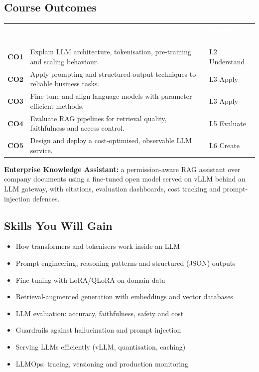 \documentclass[10pt,a4paper]{article}
\newcommand{\hdr}{\rowcolor{navy}}
\newcommand{\hw}[1]{\textcolor{white}{\bfseries #1}}
\begin{document}
\subsection*{Course Outcomes}
\par{\small\begin{tabularx}{\linewidth}{@{}>{\bfseries}p{0.9cm}Y>{\raggedright\arraybackslash}p{2.3cm}@{}}\hdr\hw{CO}&\hw{On completion, the learner will be able to}&\hw{Bloom Level}\\
CO1 & Explain LLM architecture, tokenisation, pre-training and scaling behaviour. & L2 Understand\\
CO2 & Apply prompting and structured-output techniques to reliable business tasks. & L3 Apply\\
CO3 & Fine-tune and align language models with parameter-eﬀicient methods. & L3 Apply\\
CO4 & Evaluate RAG pipelines for retrieval quality, faithfulness and access control. & L5 Evaluate\\
CO5 & Design and deploy a cost-optimised, observable LLM service. & L6 Create\\
\bottomrule\end{tabularx}}
\begin{tcolorbox}[colback=goldbg,colframe=goldl,boxrule=0.7pt,arc=2pt,title={Enterprise Capstone Product},colbacktitle=goldl!35,coltitle=navy,fonttitle=\small\bfseries]\small\textbf{Enterprise Knowledge Assistant:} a permission-aware RAG assistant over company documents using a fine-tuned open model served on vLLM behind an LLM gateway, with citations, evaluation dashboards, cost tracking and prompt-injection defences.\end{tcolorbox}
\subsection*{Skills You Will Gain}\begin{multicols}{2}\begin{itemize}\small
\item How transformers and tokenisers work inside an LLM
\item Prompt engineering, reasoning patterns and structured (JSON) outputs
\item Fine-tuning with LoRA/QLoRA on domain data
\item Retrieval-augmented generation with embeddings and vector databases
\item LLM evaluation: accuracy, faithfulness, safety and cost
\item Guardrails against hallucination and prompt injection
\item Serving LLMs efficiently (vLLM, quantisation, caching)
\item LLMOps: tracing, versioning and production monitoring
\end{itemize}\end{multicols}
\end{document}
